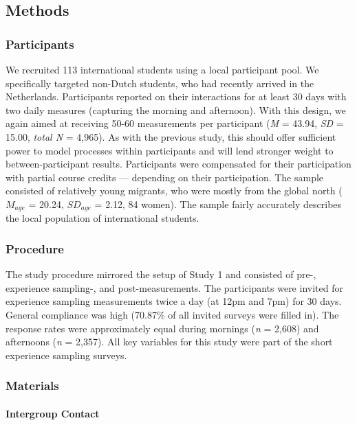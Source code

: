 \subsection{Methods}

\subsubsection{Participants}

We recruited 113 international students using a local participant pool.
We specifically targeted non-Dutch students, who had recently arrived in
the Netherlands. Participants reported on their interactions for at
least 30 days with two daily measures (capturing the morning and
afternoon). With this design, we again aimed at receiving 50-60
measurements per participant (\textit{M} = 43.94, \textit{SD} = 15.00,
\textit{total N} = 4,965). As with the previous study, this should offer
sufficient power to model processes within participants and will lend
stronger weight to between-participant results. Participants were
compensated for their participation with partial course credits ---
depending on their participation. The sample consisted of relatively
young migrants, who were mostly from the global north (\(M_{age}\) =
20.24, \(SD_{age}\) = 2.12, 84 women). The sample fairly accurately
describes the local population of international students.

\subsubsection{Procedure}

The study procedure mirrored the setup of Study 1 and consisted of pre-,
experience sampling-, and post-measurements. The participants were
invited for experience sampling measurements twice a day (at 12pm and
7pm) for 30 days. General compliance was high (70.87\% of all invited
surveys were filled in). The response rates were approximately equal
during mornings (\textit{n} = 2,608) and afternoons (\textit{n} =
2,357). All key variables for this study were part of the short
experience sampling surveys.

\subsubsection{Materials}

\paragraph{Intergroup Contact}

